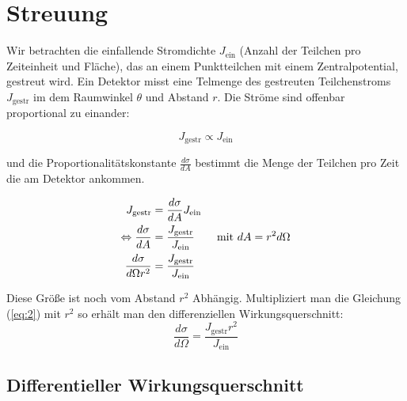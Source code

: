 
\graphicspath{{./streuung_pics}}%
\usepackage{amsmath} 





\section*{Streuung}


Wir betrachten die einfallende Stromdichte \(J_{\text{ein}}\) (Anzahl der Teilchen pro Zeiteinheit und Fläche), das an einem Punktteilchen mit einem Zentralpotential, gestreut wird. Ein Detektor misst eine Telmenge des gestreuten Teilchenstroms \(J_{\text{gestr}}\) im dem Raumwinkel \(\theta\) und Abstand \(r\). Die Ströme sind offenbar proportional zu einander:

\begin{equation}
  \label{eq:1}
  J_{\text{gestr}} \propto J_{\text{ein}}
\end{equation}


\begin{figure}
  \centering
  
\end{figure}


und die Proportionalitätskonstante \(\frac{d\sigma}{dA}\) bestimmt die Menge der Teilchen pro Zeit die am Detektor ankommen. 

\begin{align}
  \label{eq:2}
  J_{\text{gestr}} &= \frac{d\sigma}{dA} J_{\text{ein}}\notag\\
\Leftrightarrow \frac{d\sigma}{dA} &= \frac{ J_{\text{gestr}} }{J_{\text{ein}}} \qquad \text{mit }dA=r^2d\Omega\notag\\
\frac{d\sigma}{d\Omega r^2} &= \frac{ J_{\text{gestr}} }{J_{\text{ein}}} 
\end{align}

Diese Größe ist noch vom Abstand \(r^2\) Abhängig. Multipliziert man die Gleichung (\ref{eq:2}) mit \(r^2\) so erhält man den differenziellen Wirkungsquerschnitt:
\begin{equation}
  \label{eq:3}
  \boxed{ \frac{d\sigma}{d\Omega} = \frac{ J_{\text{gestr}}r^2 }{J_{\text{ein}}} }
\end{equation}


\subsection*{Differentieller Wirkungsquerschnitt}

